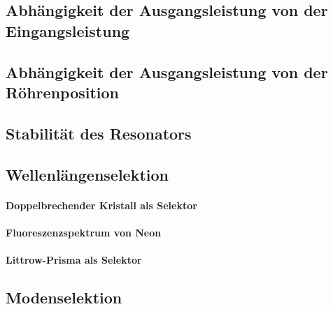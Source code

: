 \documentclass[../main.tex]{subfiles}
\begin{document}

\subsection{Abhängigkeit der Ausgangsleistung von der Eingangsleistung}


\subsection{Abhängigkeit der Ausgangsleistung von der Röhrenposition}


\subsection{Stabilität des Resonators}



\subsection{Wellenlängenselektion}
    \paragraph{Doppelbrechender Kristall als Selektor}

    \paragraph{Fluoreszenzspektrum von Neon}

    \paragraph{Littrow-Prisma als Selektor}

\subsection{Modenselektion}
    
\end{document}
